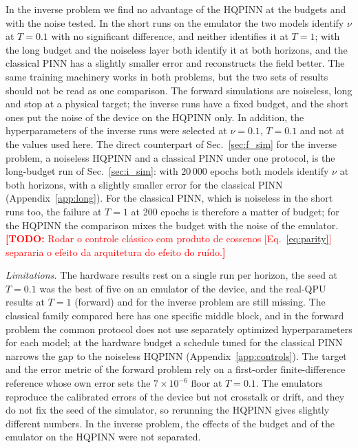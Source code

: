 \documentclass[floatfix,aps,pra,twocolumn,superscriptaddress,10pt,nofootinbib]{revtex4-2}
\newif\ifshowtodos \showtodostrue
\newcommand{\TODO}[1]{\ifshowtodos\textcolor{red}{\textbf{[TODO:} #1\textbf{]}}\fi}
\begin{document}
In the inverse problem we find no advantage of the HQPINN at the budgets and with the noise tested. In the short runs on the emulator the two models identify $\nu$ at $T=0.1$ with no significant difference, and neither identifies it at $T=1$; with the long budget and the noiseless layer both identify it at both horizons, and the classical PINN has a slightly smaller error and reconstructs the field better. The same training machinery works in both problems, but the two sets of results should not be read as one comparison. The forward simulations are noiseless, long and stop at a physical target; the inverse runs have a fixed budget, and the short ones put the noise of the device on the HQPINN only. In addition, the hyperparameters of the inverse runs were selected at $\nu=0.1$, $T=0.1$ and not at the values used here. The direct counterpart of Sec.~\ref{sec:f_sim} for the inverse problem, a noiseless HQPINN and a classical PINN under one protocol, is the long-budget run of Sec.~\ref{sec:i_sim}: with $20\,000$ epochs both models identify $\nu$ at both horizons, with a slightly smaller error for the classical PINN (Appendix~\ref{app:long}). For the classical PINN, which is noiseless in the short runs too, the failure at $T=1$ at 200 epochs is therefore a matter of budget; for the HQPINN the comparison mixes the budget with the noise of the emulator. \TODO{Rodar o controle cl\'assico com produto de cossenos [Eq.~\eqref{eq:parity}] separaria o efeito da arquitetura do efeito do ru\'ido.}

\emph{Limitations.} The hardware results rest on a single run per horizon, the seed at $T=0.1$ was the best of five on an emulator of the device, and the real-QPU results at $T=1$ (forward) and for the inverse problem are still missing. The classical family compared here has one specific middle block, and in the forward problem the common protocol does not use separately optimized hyperparameters for each model; at the hardware budget a schedule tuned for the classical PINN narrows the gap to the noiseless HQPINN (Appendix~\ref{app:controls}). The target and the error metric of the forward problem rely on a first-order finite-difference reference whose own error sets the $7\times10^{-6}$ floor at $T=0.1$. The emulators reproduce the calibrated errors of the device but not crosstalk or drift, and they do not fix the seed of the simulator, so rerunning the HQPINN gives slightly different numbers. In the inverse problem, the effects of the budget and of the emulator on the HQPINN were not separated.
\end{document}
